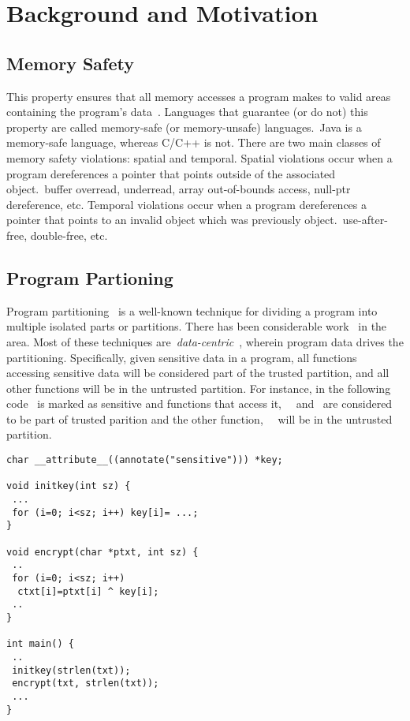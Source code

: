 \section{Background and Motivation}

\subsection{Memory Safety}
This property ensures that all memory accesses a program makes to valid areas containing the program's data~\cite{payer2019software}.
Languages that guarantee (or do not) this property are called memory-safe (or memory-unsafe) languages.~\eg Java is a memory-safe language, whereas C/C++ is not.
There are two main classes of memory safety violations: spatial and temporal.
Spatial violations occur when a program dereferences a pointer that points outside of the associated object.~\eg buffer overread, underread, array out-of-bounds access, null-ptr dereference, etc.
Temporal violations occur when a program dereferences a pointer that points to an invalid object which was previously object.~\eg use-after-free, double-free, etc.

\subsection{Program Partioning}
\label{subsec:background:programpart}
Program partitioning~\cite{rul2009towards} is a well-known technique for dividing a program into multiple isolated parts or partitions.
There has been considerable work~\cite{tan2017principles, brumley2004privtrans, bittau2008wedge, lind2017glamdring, liu2017ptrsplit} in the area.
Most of these techniques are~\emph{data-centric}~\cite{lind2017glamdring, liu2017ptrsplit}, wherein program data drives the partitioning.
Specifically, given sensitive data in a program, all functions accessing sensitive data will be considered part of the trusted partition, and all other functions will be in the untrusted partition.
For instance, in the following code~ is marked as sensitive and functions that access it,~\ie{}~ and~ are considered to be part of trusted parition and the other function,~\ie{}~ will be in the untrusted partition.
\begin{verbatim}
char __attribute__((annotate("sensitive"))) *key;

void initkey(int sz) {
 ...
 for (i=0; i<sz; i++) key[i]= ...;
}

void encrypt(char *ptxt, int sz) {
 ..
 for (i=0; i<sz; i++)
  ctxt[i]=ptxt[i] ^ key[i];
 ..
}

int main() {
 ..
 initkey(strlen(txt));
 encrypt(txt, strlen(txt));
 ... 
}
\end{verbatim}

